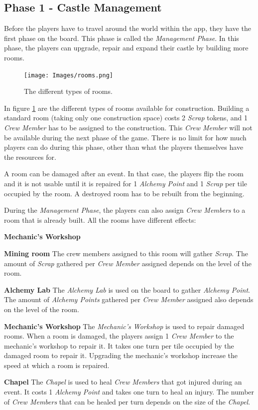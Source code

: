 \subsection{Phase 1 - Castle Management}
\label{sec:p1}
Before the players have to travel around the world within the app, they have the first phase on the board. This phase is called the \textit{Management Phase}. In this phase, the players can upgrade, repair and expand their castle by building more rooms.

\begin{figure}[!ht]
    \centering
    \texttt{[image: Images/rooms.png]}
    \caption{The different types of rooms.}
    \label{fig:roomtype}
\end{figure}

In figure \ref{fig:roomtype} are the different types of rooms available for construction. Building a standard room (taking only one construction space) costs 2 \textit{Scrap} tokens, and 1 \textit{Crew Member} has to be assigned to the construction. This \textit{Crew Member} will not be available during the next phase of the game.
There is no limit for how much players can do during this phase, other than what the players themselves have the resources for. 

A room can be damaged after an event. In that case, the players flip the room and it is not usable until it is repaired for 1 \textit{Alchemy Point} and 1 \textit{Scrap} per tile occupied by the room. A destroyed room has to be rebuilt from the beginning.


During the \textit{Management Phase}, the players can also assign \textit{Crew Members} to a room that is already built. All the rooms have different effects:
\begin{labeling}{\textbf{Mechanic's Workshop}}
\item[\textbf{Mining room}] The crew members assigned to this room will gather \textit{Scrap}. The amount of \textit{Scrap} gathered per \textit{Crew Member} assigned depends on the level of the room.
\item[\textbf{Alchemy Lab}] The \textit{Alchemy Lab} is used on the board to gather \textit{Alchemy Point}. The amount of \textit{Alchemy Points} gathered per \textit{Crew Member} assigned also depends on the level of the room.
\item[\textbf{Mechanic's Workshop}] The \textit{Mechanic's Workshop} is used to repair damaged rooms. When a room is damaged, the players assign 1 \textit{Crew Member} to the mechanic's workshop to repair it. It takes one turn per tile occupied by the damaged room to repair it. Upgrading the mechanic's workshop increase the speed at which a room is repaired.
\item[\textbf{Chapel}] The \textit{Chapel} is used to heal \textit{Crew Members} that got injured during an event. It costs 1 \textit{Alchemy Point} and takes one turn to heal an injury. The number of \textit{Crew Members} that can be healed per turn depends on the size of the \textit{Chapel}.
\end{labeling}


